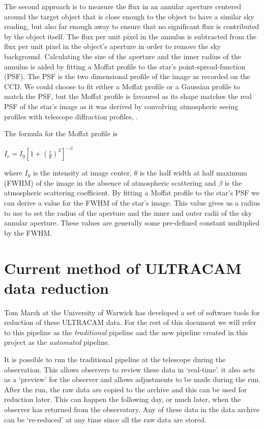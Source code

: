 The second approach is to measure the flux in an annular aperture centered around the target object that is close enough to the object to have a similar sky reading, but also far enough away to ensure that no significant flux is contributed by the object itself. The flux per unit pixel in the annulus is subtracted from the flux per unit pixel in the object's aperture in order to remove the sky background. Calculating the size of the aperture and the inner radius of the annulus is aided by fitting a Moffat profile to the star's point-spread-function (PSF). The PSF is the two dimensional profile of the image as recorded on the CCD.  We could choose to fit either a Moffat profile or a Gaussian profile to match the PSF, but the Moffat profile is favoured as its shape matches the real PSF of the star's image as it was derived by convolving atmospheric seeing profiles with telescope diffraction profiles, \citep{Moffat69}. 

The formula for the Moffat profile is 

$ I_r = I_0 {[1 + {(\frac{r}{\theta})}^2]}^{-\beta}$

where $I_0$ is the intensity at image center, $\theta$ is the half width at half maximum (FWHM) of the image in the absence of atmospheric scattering and $\beta$ is the atmospheric scattering coefficient. By fitting a Moffat profile to the star's PSF we can derive a value for the FWHM of the star's image. This value gives us a radius to use to set the radius of the aperture and the inner and outer radii of the sky annular aperture. These values are generally some pre-defined constant multiplied by the FWHM.

\section{Current method of ULTRACAM data reduction}
Tom Marsh at the University of Warwick has developed a set of software tools for reduction of these ULTRACAM data. For the rest of this document we will refer to this pipeline as the \emph{traditional} pipeline and the new pipeline created in this project as the \emph{automated} pipeline. 

It is possible to run the traditional pipeline at the telescope during the observation. This allows observers to review these data in `real-time'. it also acts as a `preview' for the observer and allows adjustments to be made during the run. After the run, the raw data are copied to the archive and this can be used for reduction later. This can happen the following day, or much later, when the observer has returned from the observatory. Any of these data in the data archive can be `re-reduced' at any time since all the raw data are stored. 

